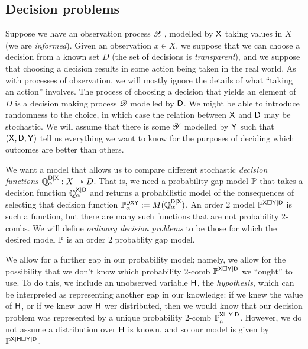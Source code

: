 \subsection{Decision problems}

Suppose we have an observation process $\mathscr{X}$, modelled by $\mathsf{X}$ taking values in $X$ (we are \emph{informed}). Given an observation $x\in X$, we suppose that we can choose a decision from a known set $D$ (the set of decisions is \emph{transparent}), and we suppose that choosing a decision results in some action being taken in the real world. As with processes of observation, we will mostly ignore the details of what ``taking an action'' involves. The process of choosing a decision that yields an element of $D$ is a decision making process $\mathscr{D}$ modelled by $\mathsf{D}$. We might be able to introduce randomness to the choice, in which case the relation between $\mathsf{X}$ and $\mathsf{D}$ may be stochastic.  We will assume that there is some $\mathscr{Y}$ modelled by $\mathsf{Y}$ such that $(\mathsf{X},\mathsf{D},\mathsf{Y})$ tell us everything we want to know for the purposes of deciding which outcomes are better than others.

We want a model that allows us to compare different stochastic \emph{decision functions} $\mathbb{Q}^{\mathsf{D}|\mathsf{X}}_\alpha:X\rightarrowtriangle D$. That is, we need a probability gap model $\mathbb{P}$ that takes a decision function $\mathbb{Q}^{\mathsf{X}|\mathsf{D}}_\alpha$ and returns a probabilistic model of the consequences of selecting that decision function $\mathbb{P}_\alpha^{\mathsf{DXY}}:=M(\mathbb{Q}_\alpha^{\mathsf{D}|\mathsf{X}})$. An order 2 model $\mathbb{P}^{\mathsf{X}\square \mathsf{Y}|\mathsf{D}}$ is such a function, but there are many such functions that are not probability 2-combs. We will define \emph{ordinary decision problems} to be those for which the desired model $\mathbb{P}$ is an order 2 probablity gap model.

We allow for a further gap in our probability model; namely, we allow for the possibility that we don't know which probability 2-comb $\mathbb{P}^{\mathsf{X}\square \mathsf{Y}|\mathsf{D}}$ we ``ought'' to use. To do this, we include an unobserved variable $\mathsf{H}$, the \emph{hypothesis}, which can be interpreted as representing another gap in our knowledge: if we knew the value of $\mathsf{H}$, or if we knew how $\mathsf{H}$ wer distributed, then we would know that our decision problem was represented by a unique probability 2-comb $\mathbb{P}_h^{\mathsf{X}\square \mathsf{Y}|\mathsf{D}}$. However, we do not assume a distribution over $\mathsf{H}$ is known, and so our model is given by $\mathbb{P}^{\mathsf{X}|\mathsf{H}\square \mathsf{Y}|\mathsf{D}}$.

